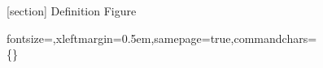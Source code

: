 [section]
\renewcommand{\themapblk}{\thesection.\arabic{mapblk}}
\expandafter\def\csname mapkind@appdef\endcsname{Definition}
\expandafter\def\csname mapkind@appfig\endcsname{Figure}
\newcommand{\mapblockhead}[5]{%
  \par\medskip\noindent\refstepcounter{mapblk}%
  {\bfseries\csname mapkind@#4\endcsname\ \themapblk}\ (#1)\ifx&#3&\else\ \lfadd{\textsf{(LF)}}\fi
  \label[#4]{app:#2}\ #5\par\nopagebreak\smallskip}
\newcommand{\mapexamplehead}[2]{\par\medskip\noindent{\itshape #1}\label{app:#2}\hfill{\scriptsize\texttt{#2}}\par\nopagebreak}
\newcommand{\mapdfvariant}{\par\noindent{\small Deadlock-free instance.}\par\nopagebreak}
\newcommand{\mapsource}[1]{\par\noindent{\scriptsize\raggedright Rocq: #1\par}\medskip}

\newcommand{\lstkw}[1]{{\color{kwcolor}#1}}
\newcommand{\lstcmt}[1]{{\color{cmtcolor}#1}}
%
  {fontsize=\footnotesize,xleftmargin=0.5em,samepage=true,commandchars=\\\{\}}


